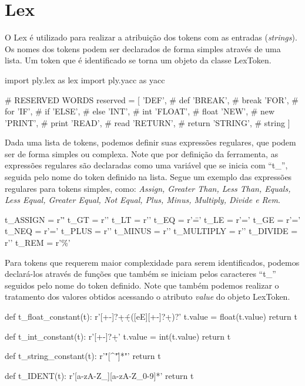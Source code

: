 \documentclass[
	12pt,				%
	openright,			%
	twoside,			%
	a4paper,			%
	english,			%
	french,				%
	spanish,			%
	brazil				%
	]{abntex2}
\begin{document}
\section{Lex}
O Lex é utilizado para realizar a atribuição dos tokens com as entradas (\emph{strings}).
Os nomes dos tokens podem ser declarados de forma simples através de uma lista. Um token
que é identificado se torna um objeto da classe LexToken.
\begin{python}
import ply.lex as lex
import ply.yacc as yacc

# RESERVED WORDS
reserved = [
    'DEF',         # def
    'BREAK',       # break
    'FOR',         # for
    'IF',          # if
    'ELSE',        # else
    'INT',         # int
    'FLOAT',       # float
    'NEW',         # new
    'PRINT',       # print
    'READ',        # read
    'RETURN',      # return
    'STRING',      # string
]
\end{python}

	Dada uma lista de tokens, podemos definir suas expressões regulares, que podem
ser de forma simples ou complexa. Note que por definição da ferramenta,
as expressões regulares são declaradas como uma variável que se inicia com ``t\_'',
seguida pelo nome do token definido na lista. Segue um exemplo das expressões
regulares para tokens simples, como: \emph{Assign, Greater Than, Less Than, Equals, Less Equal,
Greater Equal, Not Equal, Plus, Minus, Multiply, Divide e Rem}.
\\
\begin{python}
t_ASSIGN = r'\='
t_GT = r'\>'
t_LT = r'\<'
t_EQ = r'\=='
t_LE = r'\<='
t_GE = r'\>='
t_NEQ = r'\!='
t_PLUS = r'\+'
t_MINUS = r'\-'
t_MULTIPLY = r'\*'
t_DIVIDE = r'\/'
t_REM = r'\%'
\end{python}

Para tokens que requerem maior complexidade para serem identificados, podemos declará-los através de funções
que também se iniciam pelos caracteres ``t\_'' seguidos pelo nome do token
definido. Note que também podemos realizar o tratamento dos valores obtidos acessando
o atributo \emph{value} do objeto LexToken.
\\
\begin{python}
def t_float_constant(t):
    r'[+-]?\d+\.\d+([eE][+-]?\d+)?'
    t.value = float(t.value)
    return t

def t_int_constant(t):
    r'[+-]?\d+'
    t.value = int(t.value)
    return t

def t_string_constant(t):
    r'"[^"\n\r]*"'
    return t

def t_IDENT(t):
    r'[a-zA-Z_][a-zA-Z_0-9]*'
    return t
\end{python}
\newpage
\end{document}
